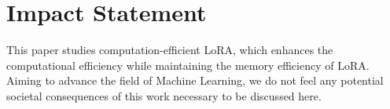 \section*{Impact Statement}
This paper studies computation-efficient LoRA, which enhances the computational efficiency while maintaining the memory efficiency of LoRA. Aiming to advance the field of Machine Learning, we do not feel any potential societal consequences of this work necessary to be discussed here.